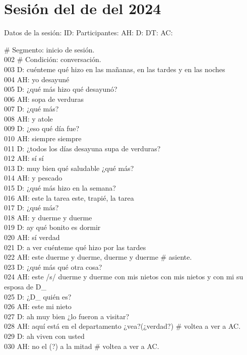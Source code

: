 \section{Sesión del de del 2024}
\noindent
Datos de la sesión:
ID:
Participantes:
AH:
D:
DT:
AC:

 # Segmento: inicio de sesión.\\
002 # Condición: conversación.\\
003 D: cuénteme qué hizo en las mañanas, en las tardes y en las noches\\
004 AH: yo desayuné\\
005 D: ¿qué más hizo qué desayunó?\\
006 AH: sopa de verduras\\
007 D: ¿qué más?\\
008 AH: y atole\\
009 D: ¿eso qué día fue?\\
010 AH: siempre siempre\\
011 D: ¿todos los días desayuna supa de verduras?\\
012 AH: sí sí\\
013 D: muy bien qué saludable ¿qué más?\\
014 AH: y pescado\\
015 D: ¿qué más hizo en la semana?\\
016 AH: este la tarea este, trapié, la tarea\\
017 D: ¿qué más?\\
018 AH: y duerme y duerme\\
019 D: ay qué bonito es dormir\\
020 AH: sí verdad\\
021 D: a ver cuénteme qué hizo por las tardes\\
022 AH: este duerme y duerme, duerme y duerme # asiente.\\
023 D: ¿qué más qué otra cosa?\\
024 AH: este /s/ duerme y duerme con mis nietos con mis nietos y con mi su esposa de D_\\
025 D: ¿D_ quién es?\\
026 AH: este mi nieto\\
027 D: ah muy bien ¿lo fueron a visitar?\\
028 AH: aquí está en el departamento ¿vea?(¿verdad?) # voltea a ver a AC.\\
029 D: ah viven con usted\\
030 AH: no el (?) a la mitad # voltea a ver a AC.\\
